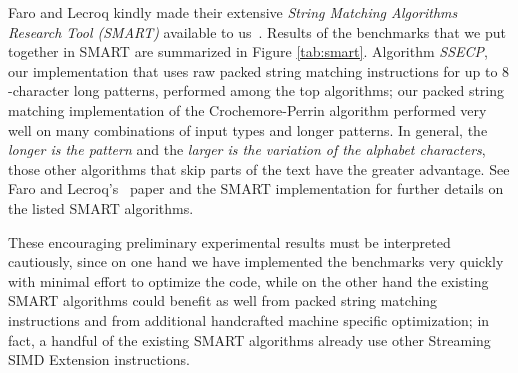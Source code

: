 \documentclass[12pt]{article}
\begin{document}
Faro and Lecroq kindly made their extensive  
{\em String Matching Algorithms Research Tool (SMART)} 
available to us~\cite{FL2011}. 
Results of the benchmarks that we put together in SMART 
are summarized in Figure \ref{tab:smart}.
Algorithm {\em SSECP}, our implementation that
uses raw packed string matching instructions
for up to $8$-character long patterns,
performed among the top algorithms;
our packed string matching implementation of the Crochemore-Perrin algorithm   
performed very well on many combinations of input types and longer patterns.
In general, the {\em longer is the pattern}
 and the {\em larger is the variation of the alphabet characters}, 
those other algorithms that skip parts of the text have the 
greater advantage.
See Faro and Lecroq's~\cite{FL2011} paper and the SMART 
implementation for further details on the listed SMART algorithms. 

These encouraging preliminary experimental results must be interpreted cautiously, since
on one hand we have implemented the benchmarks very quickly with minimal effort
to optimize the code,
while on the other hand 
the existing SMART algorithms %
could benefit
as well from packed string matching instructions and from
additional handcrafted machine specific optimization; in fact,
a handful of the existing SMART algorithms 
already use other Streaming SIMD Extension instructions.
\end{document}

